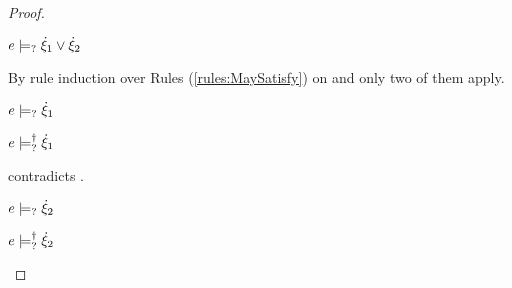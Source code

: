\begin{proof}
\begin{byCases}
  \item[\text{(\ref{rule:CSMSMay})}]
    \begin{pfsteps*}
    \item $e \models_{?} \dot{\xi}_1 \vee \dot{\xi}_2$  
    \end{pfsteps*}
    By rule induction over Rules (\ref{rules:MaySatisfy}) on  and only two of them apply.
    \begin{byCases}

    \item[\text{(\ref{rule:CMSOr1})}]
      \begin{pfsteps*}
      \item $e \models_{?} \dot{\xi}_1$  
      \item $e \models_{?}^{\dag} \dot{\xi}_1$  
      \end{pfsteps*}
       contradicts .

    \item[\text{(\ref{rule:CMSOr2})}]
      \begin{pfsteps*}
      \item $e \models_{?} \dot{\xi}_2$  
      \item $e \models_{?}^{\dag} \dot{\xi}_2$ 
      \end{pfsteps*}
    \end{byCases}
    \resetpfcounter
  \end{byCases}
\end{proof}

